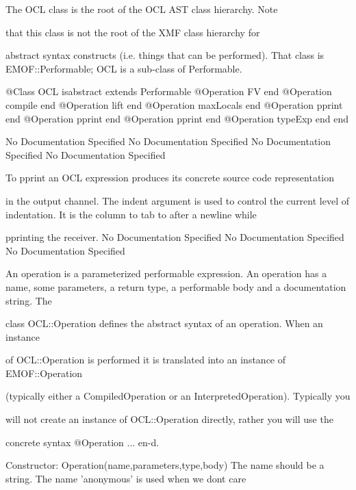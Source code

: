         The OCL class is the root of the OCL AST class hierarchy. Note

        that this class is not the root of the XMF class hierarchy for

        abstract syntax constructs (i.e. things that can be performed).
        That class is EMOF::Performable; OCL is a sub-class of Performable.
\begin{Interface}
@Class OCL isabstract extends Performable
  @Operation FV end
  @Operation compile end
  @Operation lift end
  @Operation maxLocals end
  @Operation pprint end
  @Operation pprint end
  @Operation pprint end
  @Operation typeExp end
end
\end{Interface}
No Documentation Specified
No Documentation Specified
No Documentation Specified
No Documentation Specified

          To pprint an OCL expression produces its concrete source code representation

          in the output channel. The indent argument is used to control the current 
          level of indentation. It is the column to tab to after a newline while

          pprinting the receiver.
No Documentation Specified
No Documentation Specified
No Documentation Specified

      An operation is a parameterized performable expression. An operation has a name,
      some parameters, a return type, a performable body and a documentation string. The

      class OCL::Operation defines the abstract syntax of an operation. When an instance

      of OCL::Operation is performed it is translated into an instance of EMOF::Operation

      (typically either a CompiledOperation or an InterpretedOperation). Typically you

      will not create an instance of OCL::Operation directly, rather you will use the

      concrete syntax @Operation ... en-d.
       
      Constructor: Operation(name,parameters,type,body)
        The name should be a string. The name 'anonymous' is used when we dont care

